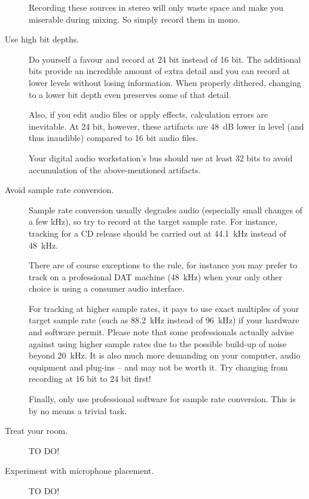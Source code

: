 \begin{description}
  Recording these sources in stereo will only waste space and make you
  miserable during mixing.  So simply record them in mono.

\item[Use high bit depths.]  Do yourself a favour and record at 24 bit
  instead of 16 bit.  The additional bits provide an incredible amount
  of extra detail and you can record at lower levels without losing
  information.  When properly dithered, changing to a lower bit depth
  even preserves some of that detail.

  Also, if you edit audio files or apply effects, calculation errors
  are inevitable.  At 24 bit, however, these artifacts are
  \SI{48}{\dB} lower in level (and thus inaudible) compared to 16 bit
  audio files.

  Your digital audio workstation's bus should use at least 32 bits to
  avoid accumulation of the above-mentioned artifacts.

\item[Avoid sample rate conversion.]  Sample rate conversion usually
  degrades audio (especially small changes of a few \si{\kilo\hertz}),
  so try to record at the target sample rate.  For instance, tracking
  for a CD release should be carried out at \SI{44.1}{\kilo\hertz}
  instead of \SI{48}{\kilo\hertz}.

  There are of course exceptions to the rule, for instance you may
  prefer to track on a professional DAT machine (\SI{48}{\kilo\hertz})
  when your only other choice is using a consumer audio interface.

  For tracking at higher sample rates, it pays to use exact multiples
  of your target sample rate (such as \SI{88.2}{\kilo\hertz} instead
  of \SI{96}{\kilo\hertz}) if your hardware and software permit.
  Please note that some professionals actually advise against using
  higher sample rates due to the possible build-up of noise beyond
  \SI{20}{\kilo\hertz}.  It is also much more demanding on your
  computer, audio equipment and plug-ins -- and may not be worth it.
  Try changing from recording at 16 bit to 24 bit first!

  Finally, only use professional software for sample rate conversion.
  This is by no means a trivial task.

\item[Treat your room.]  TO DO!

\item[Experiment with microphone placement.]  TO DO!

\end{description}

